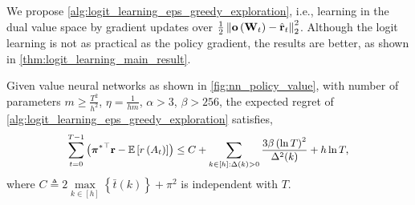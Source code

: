 We propose \cref{alg:logit_learning_eps_greedy_exploration}, i.e., learning in the dual value space by gradient updates over $\frac{1}{2} \left\| {\mathbf{o}}\left( {\mathbf{W}}_t\right) - \hat{{\mathbf{r}}}_t \right\|_2^2$. Although the logit learning is not as practical as the policy gradient, the results are better, as shown in \cref{thm:logit_learning_main_result}.

\begin{thm}
\label{thm:logit_learning_main_result}
    Given value neural networks as shown in \cref{fig:nn_policy_value}, with number of parameters $m \ge \frac{T^2}{h^2}$, $\eta = \frac{1}{h m}$, $\alpha > 3$, $\beta > 256$, the expected regret of \cref{alg:logit_learning_eps_greedy_exploration} satisfies,
\begin{equation*}
\small
\begin{split}
    \sum\limits_{t=0}^{T-1}{ \left( {\rvpi^*}^\top \rvr - \sE \left[ r\left(A_t\right) \right] \right)}  \le C + \sum\limits_{k \in [h] : \Delta(k) > 0}{ \frac{ 3 \beta \left( \ln{T} \right)^2}{\Delta^2(k)} }  + h \ln{T},
\end{split}
\end{equation*}
where $C \triangleq 2 \max\limits_{k \in [h]}\left\{ \bar{t}(k) \right\} + \pi^2$ is independent with $T$.
\end{thm}
